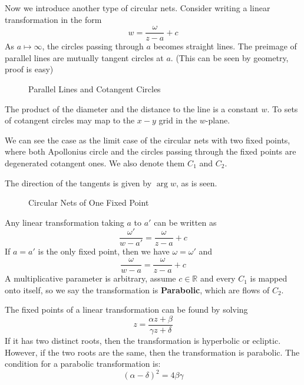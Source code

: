 \documentclass[../main.tex]{subfiles}
\begin{document}
Now we introduce another type of circular nets. Consider writing a linear transformation in the form
\begin{equation}
w = \frac{\omega}{z-a} + c
\end{equation}
As $a \mapsto \infty $, the circles passing through $a$ becomes straight lines. The preimage of parallel lines are mutually tangent circles at $a$. (This can be seen by geometry, proof is easy)

\begin{figure}[ht]
    \centering
    \caption{Parallel Lines and Cotangent Circles}
    \label{fig:parallel-lines-and-cotangent-circles}
\end{figure}

The product of the diameter and the distance to the line is a constant $w$. To sets of cotangent circles may map to the $x-y$ grid in the $w$-plane.

\begin{remark}
We can see the case as the limit case of the circular nets with two fixed points, where both Apollonius circle and the circles passing through the fixed points are degenerated cotangent ones. We also denote them $C_1$ and $C_2$.

The direction of the tangents is given by $\arg w$, as is seen.
\end{remark}

\begin{figure}[ht]
    \centering
    \caption{Circular Nets of One Fixed Point}
    \label{fig:circular-nets-of-one-fixed-point}
\end{figure}

Any linear transformation taking $a$ to $a'$ can be written as
\begin{equation}
	\frac{\omega'}{w-a'} = \frac{\omega}{z-a} + c
\end{equation}
If $a=a'$ is the only fixed point, then we have $\omega=\omega'$ and
\begin{equation*}
	\frac{\omega}{w-a} = \frac{\omega}{z-a} + c
\end{equation*}
A multiplicative parameter is arbitrary, assume $c\in \mathbb{R}$ and every $C_1$ is mapped onto itself, so we say the transformation is \textbf{Parabolic}, which are flows of $C_2$.

The fixed points of a linear transformation can be found by solving
\begin{equation}
	z = \frac{\alpha z + \beta}{\gamma z + \delta}
\end{equation}
If it has two distinct roots, then the transformation is hyperbolic or ecliptic. However, if the two roots are the same, then the transformation is parabolic. The condition for a parabolic transformation is:
\begin{equation}
	(\alpha - \delta)^2 = 4 \beta \gamma
\end{equation}
\end{document}
